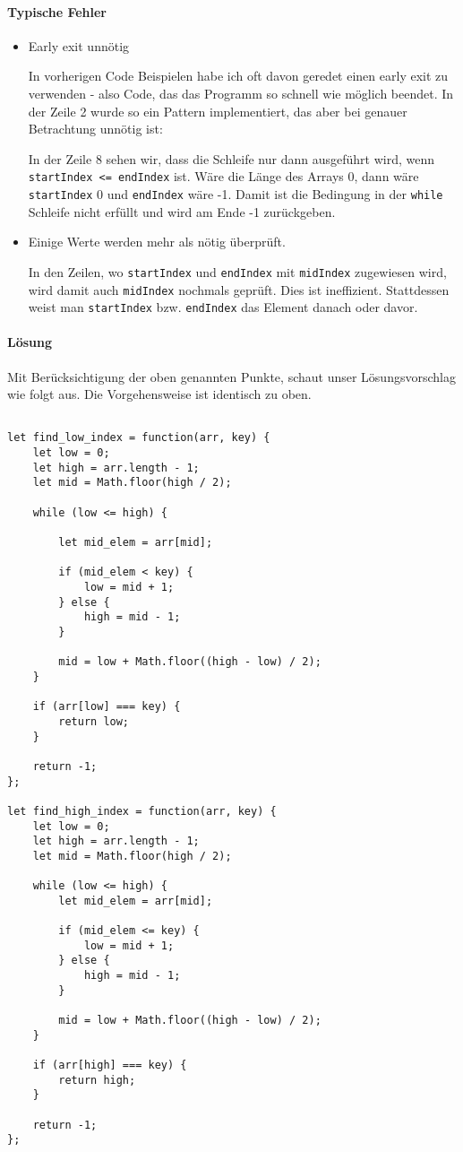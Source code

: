 \documentclass{book}
\begin{document}
\paragraph{Typische Fehler}
\begin{itemize} 
	\item Early exit unnötig
	
	In vorherigen Code Beispielen habe ich oft davon geredet einen early exit zu verwenden - also Code, das das Programm so schnell wie möglich beendet. In der Zeile 2 wurde so ein Pattern implementiert, das aber bei genauer Betrachtung unnötig ist:
	
	In der Zeile 8 sehen wir, dass die Schleife nur dann ausgeführt wird, wenn \lstinline|startIndex <= endIndex| ist. Wäre die Länge des Arrays 0, dann wäre \lstinline|startIndex| 0 und \lstinline|endIndex| wäre -1. Damit ist die Bedingung in der \lstinline|while| Schleife nicht erfüllt und wird am Ende -1 zurückgeben.
	
	\item Einige Werte werden mehr als nötig überprüft. 
	
	In den Zeilen, wo \lstinline|startIndex| und \lstinline|endIndex| mit \lstinline|midIndex| zugewiesen wird, wird damit auch \lstinline|midIndex| nochmals geprüft. Dies ist ineffizient. Stattdessen weist man \lstinline|startIndex| bzw. \lstinline|endIndex| das Element danach oder davor.
	
\end{itemize}


\paragraph{Lösung}
Mit Berücksichtigung der oben genannten Punkte, schaut unser Lösungsvorschlag wie folgt aus. Die Vorgehensweise ist identisch zu oben.

\begin{lstlisting}[caption=My Javascript Example]

let find_low_index = function(arr, key) {
	let low = 0;
	let high = arr.length - 1;
	let mid = Math.floor(high / 2);

	while (low <= high) {
	
		let mid_elem = arr[mid];
	
		if (mid_elem < key) {
			low = mid + 1;
		} else {
			high = mid - 1;
		}
	
		mid = low + Math.floor((high - low) / 2);
	}

	if (arr[low] === key) {
		return low;
	}

	return -1;
};

let find_high_index = function(arr, key) {
	let low = 0;
	let high = arr.length - 1;
	let mid = Math.floor(high / 2);

	while (low <= high) {
		let mid_elem = arr[mid];
	
		if (mid_elem <= key) {
			low = mid + 1;
		} else {
			high = mid - 1;
		}
	
		mid = low + Math.floor((high - low) / 2);
	}

	if (arr[high] === key) {
		return high;
	}

	return -1;
};
\end{lstlisting}
\end{document}
